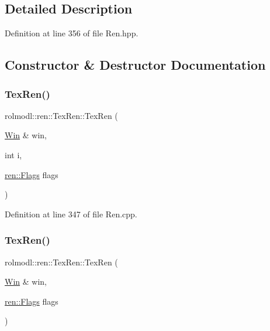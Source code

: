 \subsection{Detailed Description}


Definition at line 356 of file Ren.\+hpp.



\subsection{Constructor \& Destructor Documentation}
\mbox{\label{classrolmodl_1_1blend_mode_1_1_tex_ren_ae2c33f1543a8b6b546dea5aad6e7bab0}} 
\subsubsection{\texorpdfstring{TexRen()}{TexRen()}\hspace{0.1cm}{\footnotesize\ttfamily [1/4]}}
{\footnotesize\ttfamily rolmodl\+::ren\+::\+Tex\+Ren\+::\+Tex\+Ren (\begin{DoxyParamCaption}\item[{\mbox{\hyperlink{classrolmodl_1_1_win}{Win}} \&}]{win,  }\item[{int}]{i,  }\item[{\mbox{\hyperlink{structrolmodl_1_1blend_mode_1_1ren_1_1_flags}{ren\+::\+Flags}}}]{flags }\end{DoxyParamCaption})}



Definition at line 347 of file Ren.\+cpp.

\mbox{\label{classrolmodl_1_1blend_mode_1_1_tex_ren_a5f24efe5536afb27774aa5a33be50e9e}} 
\subsubsection{\texorpdfstring{TexRen()}{TexRen()}\hspace{0.1cm}{\footnotesize\ttfamily [2/4]}}
{\footnotesize\ttfamily rolmodl\+::ren\+::\+Tex\+Ren\+::\+Tex\+Ren (\begin{DoxyParamCaption}\item[{\mbox{\hyperlink{classrolmodl_1_1_win}{Win}} \&}]{win,  }\item[{\mbox{\hyperlink{structrolmodl_1_1blend_mode_1_1ren_1_1_flags}{ren\+::\+Flags}}}]{flags }\end{DoxyParamCaption})}



